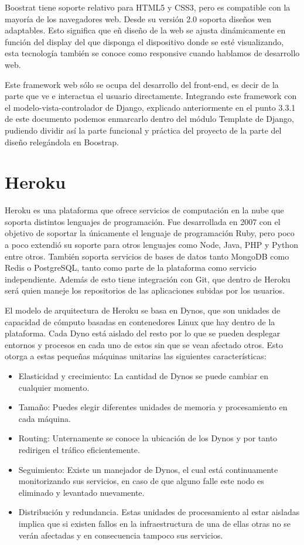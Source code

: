 \documentclass[a4paper, 12pt]{book}
\begin{document}
Boostrat tiene soporte relativo para HTML5 y CSS3, pero es compatible con la mayoría de los navegadores web. Desde su versión 2.0 soporta diseños wen adaptables. Esto significa que eñ diseño de la web se ajusta dinámicamente en función del display del que disponga el dispositivo donde se esté visualizando, esta tecnología también se conoce como responsive cuando hablamos de desarrollo web. 

Este framework web sólo se ocupa del desarrollo del front-end, es decir de la parte que ve e interactua el usuario directamente. Integrando este framework con el modelo-vista-controlador de Django, explicado anteriormente en el punto 3.3.1 de este documento podemos enmarcarlo dentro del módulo Template de Django, pudiendo dividir así la parte funcional y práctica del proyecto de la parte del diseño relegándola en Boostrap. 

\section{Heroku}
Heroku es una plataforma que ofrece servicios de computación en la nube que soporta distintos lenguajes de programación. Fue desarrollada en 2007 con el objetivo de soportar la únicamente el lenguaje de programación Ruby, pero poco a poco extendió su soporte para otros lenguajes como Node, Java, PHP y Python entre otros. También soporta servicios de bases de datos tanto MongoDB como Redis o PostgreSQL, tanto como parte de la plataforma como servicio independiente. Además de esto tiene integración con Git, que dentro de Heroku será quien maneje los repositorios de las aplicaciones subidas por los usuarios. 

El modelo de arquitectura de Heroku se basa en Dynos, que son unidades de capacidad de cómputo basadas en contenedores Linux que hay dentro de la plataforma. Cada Dyno está aislado del resto por lo que se pueden desplegar entornos y procesos en cada uno de estos sin que se vean afectado otros. Esto otorga a estas pequeñas máquinas unitarias las siguientes características: 
\begin{itemize}
	\item Elasticidad y crecimiento: La cantidad de Dynos se puede cambiar en cualquier momento. 
	\item Tamaño: Puedes elegir diferentes unidades de memoria y procesamiento en cada máquina. 
	\item Routing: Unternamente se conoce la ubicación de los Dynos y por tanto redirigen el tráfico eficientemente. 
	\item Seguimiento: Existe un manejador de Dynos, el cual está continuamente monitorizando sus servicios, en caso de que alguno falle este nodo es eliminado y levantado nuevamente. 
	\item Distribución y redundancia. Estas unidades de procesamiento al estar aisladas implica que si existen fallos en la infraestructura de una de ellas otras no se verán afectadas y en consecuencia tampoco sus servicios. 	
\end{itemize}
\end{document}
